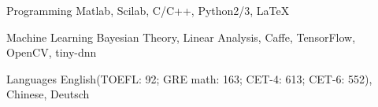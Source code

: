 


\begin{cvskills}


\cvskill
{Programming} %
{Matlab, Scilab, C/C++, Python2/3, LaTeX} %


\cvskill
{Machine Learning} %
{Bayesian Theory, Linear Analysis, Caffe, TensorFlow, OpenCV, tiny-dnn} %


\cvskill
{Languages} %
{English(TOEFL: 92; GRE math: 163; CET-4: 613; CET-6: 552), Chinese, Deutsch} %


\end{cvskills}
